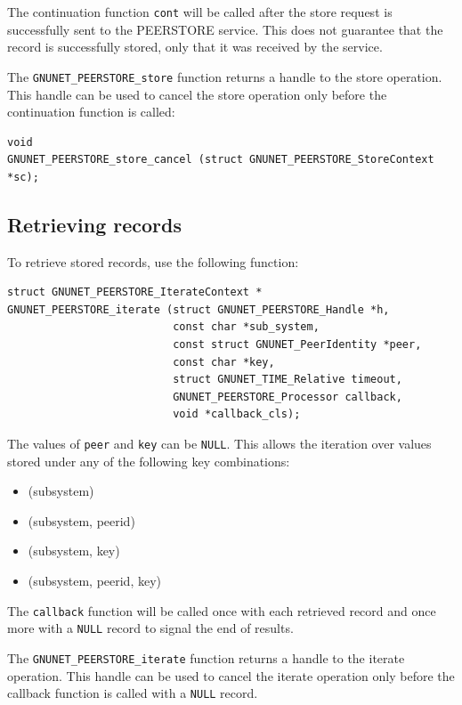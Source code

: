 \documentclass[10pt]{article}
\begin{document}
The continuation function \lstinline|cont| will be called after the store request is successfully
sent to the PEERSTORE service. This does not guarantee that the record is successfully stored, only
that it was received by the service.

The \lstinline|GNUNET_PEERSTORE_store| function returns a handle to the store operation. This handle
can be used to cancel the store operation only before the continuation function is called:
\begin{lstlisting}
void
GNUNET_PEERSTORE_store_cancel (struct GNUNET_PEERSTORE_StoreContext *sc);
\end{lstlisting}

\subsection{Retrieving records}

To retrieve stored records, use the following function:
\begin{lstlisting}
struct GNUNET_PEERSTORE_IterateContext *
GNUNET_PEERSTORE_iterate (struct GNUNET_PEERSTORE_Handle *h,
                          const char *sub_system,
                          const struct GNUNET_PeerIdentity *peer,
                          const char *key,
                          struct GNUNET_TIME_Relative timeout,
                          GNUNET_PEERSTORE_Processor callback,
                          void *callback_cls);
\end{lstlisting}
The values of \lstinline|peer| and \lstinline|key| can be \lstinline|NULL|. This allows the
iteration over values stored under any of the following key combinations:
\begin{itemize}
\itemsep0em
  \item (subsystem)
  \item (subsystem, peerid)
  \item (subsystem, key)
  \item (subsystem, peerid, key)
\end{itemize}

The \lstinline|callback| function will be called once with each retrieved record and once
more with a \lstinline|NULL| record to signal the end of results.

The \lstinline|GNUNET_PEERSTORE_iterate| function returns a handle to the iterate operation. This
handle can be used to cancel the iterate operation only before the callback function is called with
a \lstinline|NULL| record.
\end{document}
